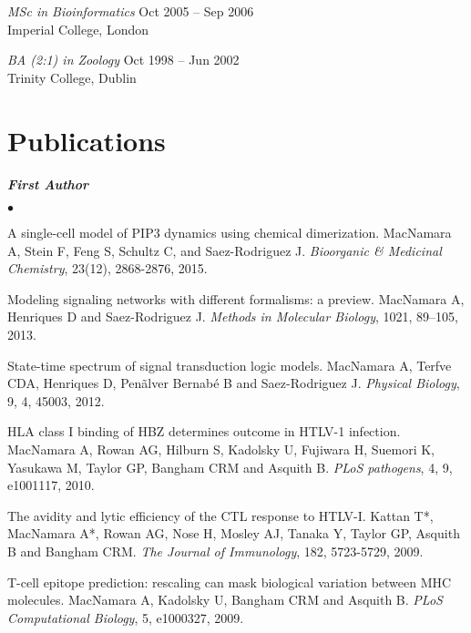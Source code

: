 \documentclass[overlapped, line, 11pt, letterpaper]{res}
\renewenvironment{itemize}{
\begin{list}{$\bullet$}
{\setlength{\itemsep}{0cm}}
}{\end{list}}
\begin{document}
\begin{resume}
\emph{MSc in Bioinformatics} \hfill Oct 2005 -- Sep 2006\\
Imperial College, London
 
\emph{BA (2:1) in Zoology} \hfill Oct 1998 -- Jun 2002\\
Trinity College, Dublin

\section{Publications}
\textbf{\emph{First Author}}
\begin{itemize}
\item A single-cell model of PIP3 dynamics using chemical dimerization. MacNamara A, Stein F, Feng S, Schultz C, and Saez-Rodriguez J. \emph{Bioorganic \& Medicinal Chemistry}, 23(12), 2868-2876, 2015.
\item Modeling signaling networks with different formalisms: a preview. MacNamara A, Henriques D and Saez-Rodriguez J. \emph{Methods in Molecular Biology}, 1021, 89–105, 2013.
\item State-time spectrum of signal transduction logic models. MacNamara A, Terfve CDA, Henriques D, Pen\~alver Bernab\'e B and Saez-Rodriguez J. \emph{Physical Biology}, 9, 4, 45003, 2012.
\item HLA class I binding of HBZ determines outcome in HTLV-1 infection. MacNamara A, Rowan AG, Hilburn S, Kadolsky U, Fujiwara H, Suemori K, Yasukawa M, Taylor GP, Bangham CRM and Asquith B. \emph{PLoS pathogens}, 4, 9, e1001117, 2010.
\item The avidity and lytic efficiency of the CTL response to HTLV-I. Kattan T*, MacNamara A*, Rowan AG, Nose H, Mosley AJ, Tanaka Y, Taylor GP, Asquith B and Bangham CRM. \emph{The Journal of Immunology}, 182, 5723-5729, 2009.
\item T-cell epitope prediction: rescaling can mask biological variation between MHC molecules. MacNamara A, Kadolsky U, Bangham CRM and Asquith B. \emph{PLoS Computational Biology}, 5, e1000327, 2009.
\end{itemize}


\end{resume}
\end{document}
